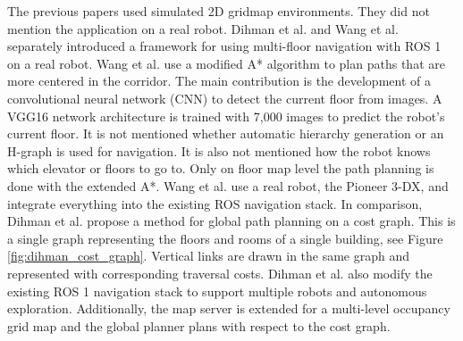 The previous papers used simulated 2D gridmap environments. They did not mention the application on a real robot. Dihman et al. \cite{dhiman_ros_2020} and Wang et al. \cite{wang_autonomous_2019} separately introduced a framework for using multi-floor navigation with ROS 1 on a real robot. Wang et al. use a modified A* algorithm to plan paths that are more centered in the corridor. The main contribution is the development of a convolutional neural network (CNN) to detect the current floor from images. A VGG16 network architecture is trained with 7,000 images to predict the robot's current floor. It is not mentioned whether automatic hierarchy generation or an H-graph is used for navigation. It is also not mentioned how the robot knows which elevator or floors to go to. Only on floor map level the path planning is done with the extended A*. Wang et al. use a real robot, the Pioneer 3-DX, and integrate everything into the existing ROS navigation stack. In comparison, Dihman et al. propose a method for global path planning on a cost graph. This is a single graph representing the floors and rooms of a single building, see Figure \ref{fig:dihman_cost_graph}. Vertical links are drawn in the same graph and represented with corresponding traversal costs. Dihman et al. also modify the existing ROS 1 navigation stack to support multiple robots and autonomous exploration. Additionally, the map server is extended for a multi-level occupancy grid map and the global planner plans with respect to the cost graph.


